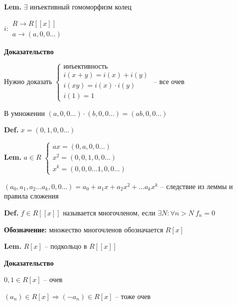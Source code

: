 \documentclass[14pt, letter paper]{article}
\begin{document}
\vspace{5mm}

\textbf{Lem.} $\exists$ инъективный гомоморфизм колец

$i : \begin{gathered}
    R \rightarrow R[[x]] \\
    a \rightarrow (a, 0, 0 \ldots)
\end{gathered}$

\begin{center}
    \textbf{Доказательство}
\end{center}

Нужно доказать $\begin{cases}
    \text{инъективность} \\
    i(x + y) = i(x) + i(y) \\
    i(xy) = i(x) \cdot i(y) \\
    i(1) = 1
\end{cases}$ -- все очев

В умножении $(a, 0, 0 \ldots) \cdot (b, 0, 0 \ldots) = (ab, 0, 0 \ldots)$

\vspace{5mm}

\textbf{Def.} $x = (0, 1, 0, 0 \ldots)$

\textbf{Lem.} $a \in R$ $\begin{cases}
    ax = (0, a, 0, 0 \ldots) \\
    x^2 = (0, 0, 1, 0, 0 \ldots) \\
    x^k = (0, 0, 0 \ldots 1, 0, 0 \ldots)
\end{cases}$

\vspace{5mm}

$(a_0, a_1, a_2 \ldots a_k, 0, 0 \ldots) = a_0 + a_1x + a_2x^2 + \ldots a_kx^k$ -- следствие из леммы и правила сложения

\textbf{Def.} $f \in R[[x]]$ называется многочленом, если $\exists N : \forall n > N\ f_n = 0$

\textbf{Обозначение:} множество многочленов обозначается $R[x]$

\textbf{Lem.} $R[x]$ -- подкольцо в $R[[x]]$

\begin{center}
    \textbf{Доказательство}
\end{center}

$0, 1 \in R[x]$ -- очев

$(a_n) \in R[x] \Rightarrow (-a_n) \in R[x]$ -- тоже очев
\end{document}

